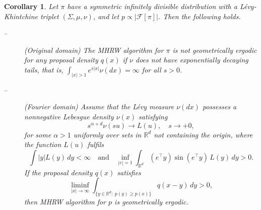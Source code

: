 \documentclass[preprint, 3p, authoryear]{elsarticle}
\newcommand{\R}{\mathbb R}
\newtheorem{corollary}{Corollary}
\theoremstyle{definition}
\begin{document}
\begin{corollary}
	Let $\pi$ have a symmetric infinitely divisible distribution with a L\'evy-Khintchine triplet $\left(\Sigma,\mu,\nu\right)$,
	and let $p \propto |\mathcal{F}[\pi]|$.
	Then the following holds.
\begin{description}
	\item[--] (Original domain) The MHRW algorithm for $\pi$ is not geometrically ergodic for any proposal density $q(x)$ if \(\nu\) does not have exponentially decaying tails,
	that is, \(\int_{{|x|>1}} e^{s|x|}\nu(dx)=\infty\) for all $s>0$.
	\item[--] (Fourier domain)  
	Assume that the L\'evy measure $\nu(dx)$ possesses a nonnegative Lebesgue density $\nu(x)$ satisfying
	\begin{equation}
	\label{eq:cond-nu-ge1}
		s^{\alpha+d}\nu(su)\longrightarrow L(u),\quad  s \to +0, 
        \end{equation}
for some $\alpha>1$ uniformly over sets in  $\mathbb{R}^d$ not containing the origin, where the function $L(u)$ fulfils 
\begin{equation}
\label{eq:cond-nu-ge2}
	\int |y| L(y)\,dy<\infty 
	\quad\text{and}\quad 
	\inf_{|e|=1}\int_{\R^d}\left(e^{\top}y\right)\sin(e^{\top}y)\,L(y)\,dy>0.
\end{equation}
If the proposal density $q(x)$ satisfies 
	\[
		\liminf_{|x|\to\infty} \int_{ \{ y\in\R^d: \ p(y) \ge p(x) \}} q(x-y) \, dy > 0,
	\]
then 	MHRW algorithm for $p$ is geometrically ergodic.
\end{description}
\end{corollary}
\end{document}
